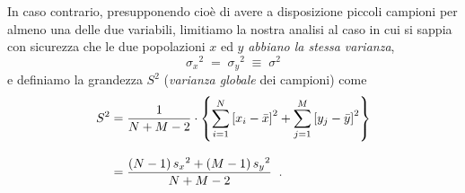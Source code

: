 %
In caso contrario, presupponendo cio\`e di avere a
disposizione piccoli campioni per almeno una delle due
variabili, limitiamo la nostra analisi al caso in cui si
sappia con sicurezza che le due popolazioni $x$ ed $y$
\emph{abbiano la stessa varianza},
\begin{equation*}
  {\sigma_x}^2 \; = \; {\sigma_y}^2 \; \equiv \;
    \sigma^2
\end{equation*}
e definiamo la grandezza $S^2$ (\emph{varianza globale} dei
campioni) come
\begin{align*}
  S^2 &= \frac{1}{N + M - 2} \cdot \left\{ \sum_{i=1}^N
    \left[ x_i - \bar x \right]^2 + \sum_{j=1}^M \left[
    y_j - \bar y \right]^2 \right\} \\[2ex]
  &= \frac{(N-1) \, {s_x}^2 + (M-1) \, {s_y}^2}{N + M -
    2} \;\; .
\end{align*}

